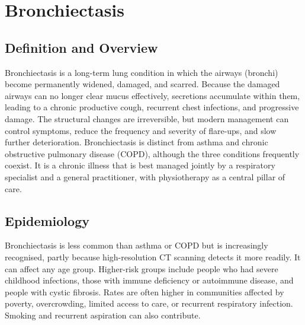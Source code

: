 \chapter{Bronchiectasis}

\section*{Definition and Overview}
Bronchiectasis is a long-term lung condition in which the airways (bronchi) become permanently widened, damaged, and scarred. Because the damaged airways can no longer clear mucus effectively, secretions accumulate within them, leading to a chronic productive cough, recurrent chest infections, and progressive damage. The structural changes are irreversible, but modern management can control symptoms, reduce the frequency and severity of flare-ups, and slow further deterioration. Bronchiectasis is distinct from asthma and chronic obstructive pulmonary disease (COPD), although the three conditions frequently coexist. It is a chronic illness that is best managed jointly by a respiratory specialist and a general practitioner, with physiotherapy as a central pillar of care.

\section*{Epidemiology}
Bronchiectasis is less common than asthma or COPD but is increasingly recognised, partly because high-resolution CT scanning detects it more readily. It can affect any age group. Higher-risk groups include people who had severe childhood infections, those with immune deficiency or autoimmune disease, and people with cystic fibrosis. Rates are often higher in communities affected by poverty, overcrowding, limited access to care, or recurrent respiratory infection. Smoking and recurrent aspiration can also contribute.

